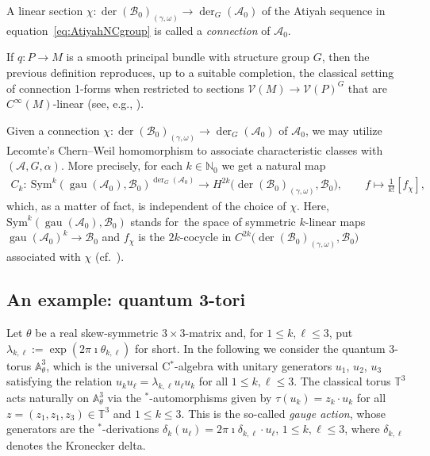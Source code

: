 \documentclass[10pt,a4paper]{amsart}
\numberwithin{equation}{section}
\DeclareMathOperator{\der}{der}
\DeclareMathOperator{\gau}{gau}
\newcommand*{\Star}{$^*$\nobreakdash}
\newcommand*{\alg}{\mathcal}		%
\newcommand*{\aA}{\alg{A}}			%
\newcommand*{\aB}{\alg{B}} 			%
\begin{document}
\begin{Definition}\label{def:connection}
A linear section $\chi\colon \der(\aB_0)_{(\gamma,\omega)} \to \der_G(\aA_0)$ of the Atiyah sequence in equation~\eqref{eq:AtiyahNCgroup} is called a \emph{connection} of $\aA_0$.
\end{Definition}

\begin{Remark}
If $q\colon P \to M$ is a smooth principal bundle with structure group $G$, then the previous definition reproduces, up to a suitable completion, the classical setting of connection 1-forms when restricted to sections $\mathcal{V}(M) \to \mathcal{V}(P)^G$ that are $C^\infty(M)$-linear (see, e.g., \cite[Chapter~XII]{Kob69II}).
\end{Remark}

Given a connection $\chi\colon \der(\aB_0)_{(\gamma,\omega)} \to \der_G(\aA_0)$ of $\aA_0$, we may utilize Lecomte's Chern--Weil homomorphism to associate characteristic classes with $(\aA,G,\alpha)$.
More precisely, for each $k \in\mathbb{N}_0$ we get a natural map
\begin{gather*}
	C_k \colon \ \text{Sym}^k(\gau(\aA_0),\aB_0)^{\der_G(\aA_0)}\rightarrow H^{2k}\big( \der(\aB_0)_{(\gamma,\omega)},\aB_0\big), \qquad f \mapsto \frac{1}{k!}[f_\chi],
\end{gather*}
which, as a matter of fact, is independent of the choice of $\chi$.
Here, $\text{Sym}^k(\gau(\aA_0),\aB_0)$ stands for~the space of symmetric $k$-linear maps $\gau(\aA_0)^k \to \aB_0$ and $f_\chi$ is the $2k$-cocycle in \linebreak $C^{2k}\big(\der(\aB_0)_{(\gamma,\omega)},\aB_0\big)$ associated with $\chi$ (cf.~\cite{Lec85,Wa18}).

\subsection{An example: quantum 3-tori}\label{sec:Q3T}

Let $\theta$ be a real skew-symmetric $3\times 3$-matrix and, for $1 \le k, \ell \le 3$, put $\lambda_{k,\ell} := \exp(2\pi \imath \theta_{k,\ell})$ for short.
In the following we consider the quantum 3-torus $\mathbb A^3_\theta$, which is the universal C\Star-algebra with unitary generators $u_1$, $u_2$, $u_3$ satisfying the relation $u_k u_\ell = \lambda_{k,\ell} u_\ell u_k$ for all $1 \le k,\ell \le 3$.
The classical torus $\mathbb T^3$ acts naturally on $\mathbb A^3_\theta$ via the \Star-automorphisms given by $\tau(u_k) = z_k \cdot u_k$ for all $z = (z_1,z_1,z_3) \in \mathbb T^3$ and $1 \le k \le 3$.
This is the so-called \emph{gauge action}, whose generators are the \Star-derivations $\delta_k(u_\ell) = 2 \pi \imath \delta_{k, \ell} \cdot u_\ell$, $1 \le k,\ell \le 3$, where $\delta_{k,\ell}$ denotes the Kronecker delta.
\end{document}
